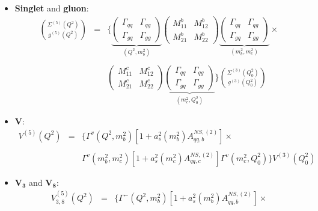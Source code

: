 \documentclass[10pt,a4paper]{article}
\begin{document}
\begin{itemize}
\item \textbf{Singlet} and \textbf{gluon}:
\begin{equation}
\begin{array}{rcl}
\displaystyle {\Sigma^{(5)}(Q^2) \choose g^{(5)}(Q^2)} &=& \displaystyle \Bigg\{\underbrace{\begin{pmatrix} \Gamma_{qq} & \Gamma_{qg} \\ \Gamma_{gq}& \Gamma_{gg}\end{pmatrix}}_{(Q^2,m_b^2)}\begin{pmatrix} M_{11}^b & M_{12}^b \\ M_{21}^b & M_{22}^b\end{pmatrix}\underbrace{\begin{pmatrix} \Gamma_{qq}& \Gamma_{qg} \\ \Gamma_{gq}& \Gamma_{gg}\end{pmatrix}}_{(m_b^2,m_c^2)}\times\\
\\
 & &\displaystyle\begin{pmatrix} M_{11}^c & M_{12}^c \\ M_{21}^c & M_{22}^c\end{pmatrix}\underbrace{\begin{pmatrix} \Gamma_{qq}& \Gamma_{qg} \\ \Gamma_{gq}& \Gamma_{gg}\end{pmatrix}}_{(m_c^2,Q_0^2)}\Bigg\}{\Sigma^{(3)}(Q_0^2) \choose g^{(3)}(Q_0^2)}
\end{array}
\end{equation}
\item $\mathbf{V}$:
\begin{equation}
\begin{array}{rcl}
V^{(5)}(Q^2)&=&\displaystyle \Big\{\Gamma^{v}(Q^2,m_b^2)[1+a_s^2(m_b^2)A_{qq,b}^{N\!S,(2)}]\times\\
\\
 & &\displaystyle \Gamma^{v}(m_b^2,m_c^2)[1+a_s^2(m_c^2)A_{qq,c}^{N\!S,(2)}]\Gamma^{v}(m_c^2,Q_0^2)\Big\}V^{(3)}(Q^2_0)
\end{array}
\end{equation}
\item $\mathbf{V_3}$ and $\mathbf{V_8}$:
\begin{equation}
\begin{array}{rcl}
V^{(5)}_{3,8}(Q^2)&=&\displaystyle \Big\{\Gamma^{-}(Q^2,m_b^2)[1+a_s^2(m_b^2)A_{qq,b}^{N\!S,(2)}]\times\\

\end{array}
\end{equation}
\end{itemize}
\end{document}
